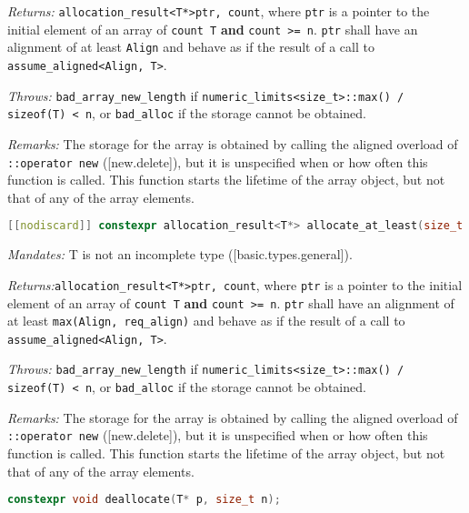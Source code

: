 \documentclass[11pt]{article}
\begin{document}
\noindent
\hangindent=1.05cm\hspace{1cm}\textit{Returns:} \texttt{allocation\_result<T*>{ptr, count}}, where \texttt{ptr} is a pointer to the initial element of an array of \texttt{count T} \textbf{and} \texttt{count >= n}. \texttt{ptr} shall have an alignment of at least \texttt{Align} and behave as if the result of a call to \texttt{assume\_aligned<Align, T>}.

\noindent
\hangindent=1.05cm\hspace{1cm}\textit{Throws:} \texttt{bad\_array\_new\_length} if \texttt{numeric\_limits<size\_t>::max() / sizeof(T) < n}, or \texttt{bad\_alloc} if the storage cannot be obtained.

\noindent
\hangindent=1.05cm\hspace{1cm}\textit{Remarks:} The storage for the array is obtained by calling the aligned overload of \texttt{::operator new} ([new.delete]), but it is unspecified when or how often this function is called. This function starts the lifetime of the array object, but not that of any of the array elements.

\begin{lstlisting}[language=C++, basicstyle=\small]
[[nodiscard]] constexpr allocation_result<T*> allocate_at_least(size_t n, align_val_t req_align);
\end{lstlisting}

\noindent
\hangindent=1.05cm\hspace{1cm}\textit{Mandates:} T is not an incomplete type ([basic.types.general]).

\noindent
\hangindent=1.05cm\hspace{1cm}\textit{Returns:}\texttt{allocation\_result<T*>{ptr, count}}, where \texttt{ptr} is a pointer to the initial element of an array of \texttt{count T} \textbf{and} \texttt{count >= n}. \texttt{ptr} shall have an alignment of at least \texttt{max(Align, req\_align)} and behave as if the result of a call to \texttt{assume\_aligned<Align, T>}.

\noindent
\hangindent=1.05cm\hspace{1cm}\textit{Throws:} \texttt{bad\_array\_new\_length} if \texttt{numeric\_limits<size\_t>::max() / sizeof(T) < n}, or \texttt{bad\_alloc} if the storage cannot be obtained.

\noindent
\hangindent=1.05cm\hspace{1cm}\textit{Remarks:} The storage for the array is obtained by calling the aligned overload of \texttt{::operator new} ([new.delete]), but it is unspecified when or how often this function is called. This function starts the lifetime of the array object, but not that of any of the array elements.
\begin{lstlisting}[language=C++, basicstyle=\small]
constexpr void deallocate(T* p, size_t n);
\end{lstlisting}
\end{document}
